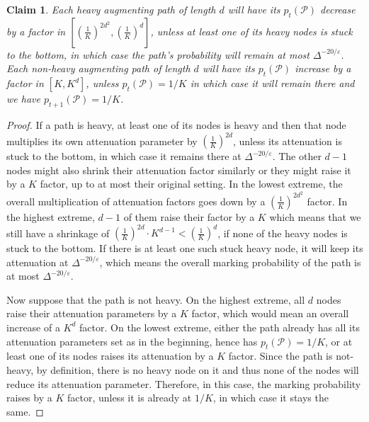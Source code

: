 \documentclass[11pt]{article}
\newtheorem{claim}[theorem]{Claim}
\newcommand{\eps}{\varepsilon}
\begin{document}
\begin{claim}\label{clm:ShrinkageGrowthBounds}  Each heavy augmenting path of length $d$ will have its $p_{t}(\mathcal{P})$ decrease by a factor in $[(\frac{1}{K})^{2d^2}, (\frac{1}{K})^{d}]$, unless at least one of its heavy nodes is stuck to the bottom, in which case the path's probability will remain at most $\Delta^{-20/\eps}$. Each non-heavy augmenting path of length $d$ will have its $p_{t}(\mathcal{P})$ increase by a factor in $[K, K^{d}]$, unless $p_{t}(\mathcal{P})=1/K$ in which case it will remain there and we have $p_{t+1}(\mathcal{P})=1/K$.
\end{claim}
\begin{proof} If a path is heavy, at least one of its nodes is heavy and then that node multiplies its own attenuation parameter by $(\frac{1}{K})^{2d}$, unless its attenuation is stuck to the bottom, in which case it remains there at $\Delta^{-20/\eps}$. The other $d-1$ nodes might also shrink their attenuation factor similarly or they might raise it by a $K$ factor, up to at most their original setting. In the lowest extreme, the overall multiplication of attenuation factors goes down by a  $(\frac{1}{K})^{2d^2}$ factor. In the highest extreme, $d-1$ of them raise their factor by a $K$ which means that we still have a shrinkage of $(\frac{1}{K})^{2d} \cdot K^{d-1} < (\frac{1}{K})^{d}$, if none of the heavy nodes is stuck to the bottom. If there is at least one such stuck heavy node, it will keep its attenuation at $\Delta^{-20/\eps}$, which means the overall marking probability of the path is at most $\Delta^{-20/\eps}$.

Now suppose that the path is not heavy. On the highest extreme, all $d$ nodes raise their attenuation parameters by a $K$ factor, which would mean an overall increase of a $K^{d}$ factor. On the lowest extreme, either the path already has all its attenuation parameters set as in the beginning, hence has $p_{t}(\mathcal{P})=1/K$, or at least one of its nodes raises its attenuation by a $K$ factor. Since the path is not-heavy, by definition, there is no heavy node on it and thus none of the nodes will reduce its attenuation parameter. Therefore, in this case, the marking probability raises by a $K$ factor, unless it is already at $1/K$, in which case it stays the same.
\end{proof}
\end{document}
